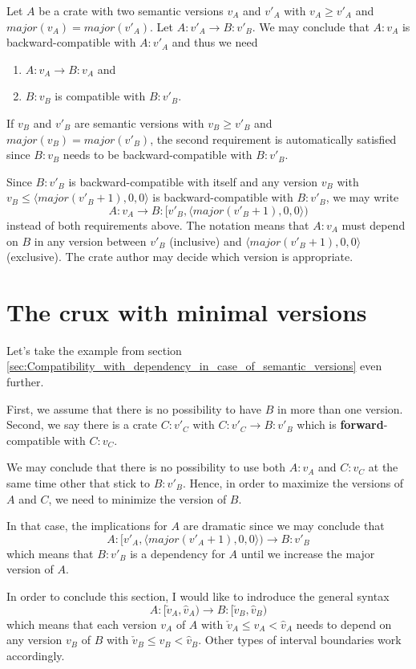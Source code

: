 \documentclass{article}
\begin{document}
    Let $A$ be a crate with two semantic versions $v_A$ and $v'_A$ with $v_A \geq v'_A$ and $major(v_A) = major(v'_A)$. Let $A:v'_A \rightarrow B:v'_B$. We may conclude that $A:v_A$ is backward-compatible with $A:v'_A$ and thus we need
    \begin{enumerate}
        \item $A:v_A \rightarrow B:v_A$ and
        \item $B:v_B$ is compatible with $B:v'_B$.
    \end{enumerate}

    If $v_B$ and $v'_B$ are semantic versions with $v_B \geq v'_B$ and $major(v_B) = major(v'_B)$, the second requirement is automatically satisfied since $B:v_B$ needs to be backward-compatible with $B:v'_B$.

    Since $B:v'_B$ is backward-compatible with itself and any version $v_B$ with $v_B \le \langle major(v'_B+1),0,0 \rangle$ is backward-compatible with $B:v'_B$, we may write
    $$
    A:v_A \rightarrow B:[v'_B, \langle major(v'_B+1),0,0 \rangle)
    $$
    instead of both requirements above. The notation means that $A:v_A$ must depend on $B$ in any version between $v'_B$ (inclusive) and $\langle major(v'_B+1),0,0 \rangle$ (exclusive). The crate author may decide which version is appropriate.

    \section{The crux with minimal versions}
    Let's take the example from section \ref{sec:Compatibility_with_dependency_in_case_of_semantic_versions} even further.

    First, we assume that there is no possibility to have $B$ in more than one version. Second, we say there is a crate $C:v'_C$ with $C:v'_C \rightarrow B:v'_B$ which is \textbf{forward}-compatible with $C:v_C$.

    We may conclude that there is no possibility to use both $A:v_A$ and $C:v_C$ at the same time other that stick to $B:v'_B$. Hence, in order to maximize the versions of $A$ and $C$, we need to minimize the version of $B$.

    In that case, the implications for $A$ are dramatic since we may conclude that
    $$
    A:[v'_A, \langle major(v'_A+1),0,0 \rangle) \rightarrow B:v'_B
    $$
    which means that $B:v'_B$ is a dependency for $A$ until we increase the major version of $A$.

    In order to conclude this section, I would like to indroduce the general syntax
    $$
    A:[\check{v}_A, \hat{v}_A) \rightarrow B:[\check{v}_B, \hat{v}_B)
    $$
    which means that each version $v_A$ of $A$ with $\check{v}_A \leq v_A < \hat{v}_A$ needs to depend on any version $v_B$ of $B$ with $\check{v}_B \leq v_B < \hat{v}_B$. Other types of interval boundaries work accordingly.
\end{document}

